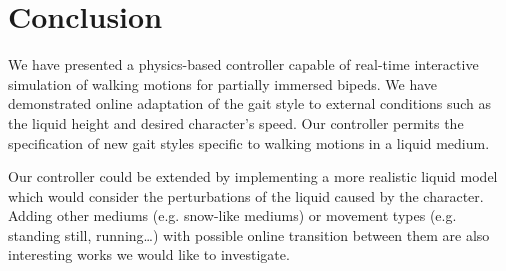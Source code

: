 \documentclass[conference]{acmsiggraph}
\begin{document}
\section{Conclusion}
\label{sec:conclusion}

We have presented a physics-based controller capable of real-time interactive simulation of walking motions for partially immersed bipeds. We have demonstrated online adaptation of the gait style to external conditions such as the liquid height and desired character's speed. Our controller permits the specification of new gait styles specific to walking motions in a liquid medium.

Our controller could be extended by implementing a more realistic liquid model which would consider the perturbations of the liquid caused by the character. Adding other mediums (e.g. snow-like mediums) or movement types (e.g. standing still, running…) with possible online transition between them are also interesting works we would like to investigate.




\end{document}
